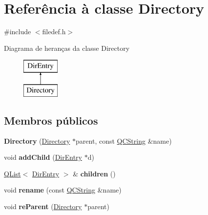 \hypertarget{class_directory}{\section{Referência à classe Directory}
\label{class_directory}
}


{\ttfamily \#include $<$filedef.\-h$>$}

Diagrama de heranças da classe Directory\begin{figure}[H]
\begin{center}
\leavevmode
\includegraphics[height=2.000000cm]{class_directory}
\end{center}
\end{figure}
\subsection*{Membros públicos}
\begin{DoxyCompactItemize}
\item 
\hypertarget{class_directory_a375ff702e1d9da1dbdcca413c2b3b4a6}{{\bfseries Directory} (\hyperlink{class_directory}{Directory} $\ast$parent, const \hyperlink{class_q_c_string}{Q\-C\-String} \&name)}\label{class_directory_a375ff702e1d9da1dbdcca413c2b3b4a6}

\item 
\hypertarget{class_directory_a579fc690f341ad074871cc9482b18f8d}{void {\bfseries add\-Child} (\hyperlink{class_dir_entry}{Dir\-Entry} $\ast$d)}\label{class_directory_a579fc690f341ad074871cc9482b18f8d}

\item 
\hypertarget{class_directory_a883ddd88827f60bb67a0982b5bf1631c}{\hyperlink{class_q_list}{Q\-List}$<$ \hyperlink{class_dir_entry}{Dir\-Entry} $>$ \& {\bfseries children} ()}\label{class_directory_a883ddd88827f60bb67a0982b5bf1631c}

\item 
\hypertarget{class_directory_a06c979a9146e234fd250464b51d974d5}{void {\bfseries rename} (const \hyperlink{class_q_c_string}{Q\-C\-String} \&name)}\label{class_directory_a06c979a9146e234fd250464b51d974d5}

\item 
\hypertarget{class_directory_a803fce0d9fe9759b9d7c6a66edfed0a4}{void {\bfseries re\-Parent} (\hyperlink{class_directory}{Directory} $\ast$parent)}\label{class_directory_a803fce0d9fe9759b9d7c6a66edfed0a4}

\end{DoxyCompactItemize}
